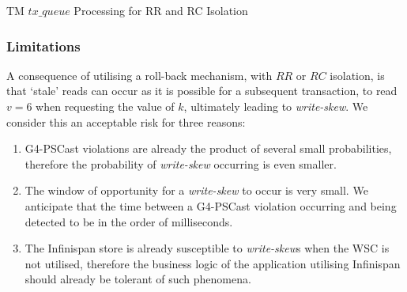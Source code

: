     \begin{algorithm}[H]
        \caption{TM $tx\_queue$ Processing for RR and RC Isolation}
        \label{ps:tx_queue_rr_rc}
        \begin{algorithmic}[1]
                
                \ENDWHILE
                             
                \ENDIF
                
                \ENDIF
                
            \ENDWHILE
        \end{algorithmic}%
    \end{algorithm}
    
    \subsubsection*{Limitations}
    A consequence of utilising a roll-back mechanism, with $RR$ or $RC$ isolation, is that \textquoteleft{}stale' reads can occur as it is possible for a subsequent transaction, to read $v = 6$ when requesting the value of $k$, ultimately leading to \emph{write-skew}.  We consider this an acceptable risk for three reasons: 
    \begin{enumerate}[label=\roman*]
        \item    G4-PSCast violations are already the product of several small probabilities, therefore the probability of \emph{write-skew} occurring is even smaller.  
        
        \item    The window of opportunity for a \emph{write-skew} to occur is very small.  We anticipate that the time between a G4-PSCast violation occurring and being detected to be in the order of milliseconds.   
        
        \item    The Infinispan store is already susceptible to \emph{write-skew}s when the WSC is not utilised, therefore the business logic of the application utilising Infinispan should already be tolerant of such phenomena.  
    \end{enumerate}    
    
